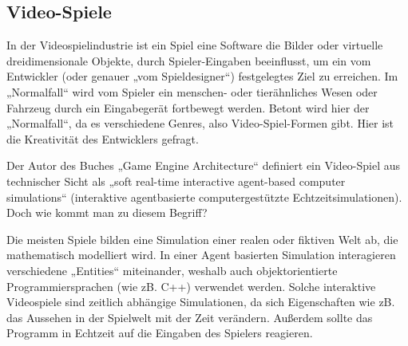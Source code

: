 \subsection{Video-Spiele}

In der Videospielindustrie ist ein Spiel eine Software die Bilder oder virtuelle dreidimensionale Objekte, durch Spieler-Eingaben beeinflusst, um ein vom Entwickler (oder genauer „vom Spieldesigner“) festgelegtes Ziel zu erreichen. 
Im „Normalfall“ wird vom Spieler ein menschen- oder tierähnliches Wesen oder Fahrzeug durch ein Eingabegerät fortbewegt werden. Betont wird hier der „Normalfall“, da es verschiedene Genres, also Video-Spiel-Formen gibt. Hier ist die Kreativität des Entwicklers gefragt.

Der Autor des Buches „Game Engine Architecture“ \cite{gea} definiert ein Video-Spiel aus technischer Sicht als „soft real-time interactive agent-based computer simulations“ (interaktive agentbasierte computergestützte Echtzeitsimulationen).
Doch wie kommt man zu diesem Begriff?

Die meisten Spiele bilden eine Simulation einer realen oder fiktiven Welt ab, die mathematisch modelliert wird. In einer Agent basierten Simulation interagieren verschiedene „Entities“ miteinander, weshalb auch objektorientierte Programmiersprachen (wie zB. C++) verwendet werden.
Solche interaktive Videospiele sind zeitlich abhängige Simulationen, da sich Eigenschaften wie zB. das Aussehen in der Spielwelt mit der Zeit verändern. Außerdem sollte das Programm in Echtzeit auf die Eingaben des Spielers reagieren.
